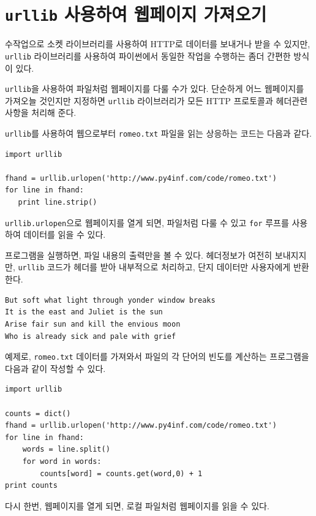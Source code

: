 
\section{{\tt urllib} 사용하여 웹페이지 가져오기}

수작업으로 소켓 라이브러리를 사용하여 HTTP로 데이터를 보내거나 받을 수 있지만,
{\tt urllib} 라이브러리를 사용하여 파이썬에서 동일한 작업을 수행하는 좀더 간편한 방식이 있다.

{\tt urllib}을 사용하여 파일처럼 웹페이지를 다룰 수가 있다.
단순하게 어느 웹페이지를 가져오늘 것인지만 지정하면 {\tt urllib} 라이브러리가 모든 HTTP 프로토콜과 헤더관련 사항을 처리해 준다.

{\tt urllib}를 사용하여 웹으로부터 {\tt romeo.txt} 파일을 읽는 상응하는 코드는 다음과 같다.

\beforeverb
\begin{verbatim}
import urllib

fhand = urllib.urlopen('http://www.py4inf.com/code/romeo.txt')
for line in fhand:
   print line.strip()
\end{verbatim}
\afterverb
%

{\tt urllib.urlopen}으로 웹페이지를 열게 되면, 파일처럼 다룰 수 있고 {\tt for} 루프를 사용하여 데이터를 읽을 수 있다.

프로그램을 실행하면, 파일 내용의 출력만을 볼 수 있다. 헤더정보가 여전히 보내지지만, {\tt urllib} 코드가 헤더를 받아 내부적으로 처리하고,
단지 데이터만 사용자에게 반환한다.

\beforeverb
\begin{verbatim}
But soft what light through yonder window breaks
It is the east and Juliet is the sun
Arise fair sun and kill the envious moon
Who is already sick and pale with grief
\end{verbatim}
\afterverb
%

예제로, {\tt romeo.txt} 데이터를 가져와서 파일의 각 단어의 빈도를 계산하는 프로그램을 다음과 같이 작성할 수 있다.

\beforeverb
\begin{verbatim}
import urllib

counts = dict()
fhand = urllib.urlopen('http://www.py4inf.com/code/romeo.txt')
for line in fhand:
    words = line.split()
    for word in words:
        counts[word] = counts.get(word,0) + 1   
print counts
\end{verbatim}
\afterverb
%

다시 한번, 웹페이지를 열게 되면, 로컬 파일처럼 웹페이지를 읽을 수 있다.

